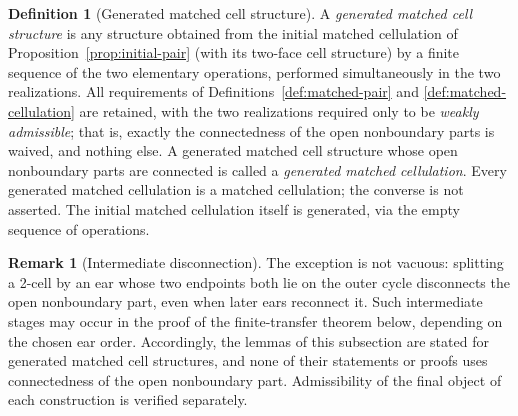 \documentclass[11pt]{article}
\theoremstyle{mainplain}
\theoremstyle{mainroman}
\theoremstyle{definition}
\newtheorem{definition}[theorem]{Definition}
\newtheorem{remark}[theorem]{Remark}
\numberwithin{equation}{section}
\begin{document}
\begin{definition}[Generated matched cell structure]\label{def:generated-structure}
A \emph{generated matched cell structure} is any structure obtained
from the initial matched cellulation of
Proposition~\ref{prop:initial-pair} (with its two-face cell structure)
by a finite sequence of the two elementary operations, performed
simultaneously in the two realizations. All requirements of
Definitions~\ref{def:matched-pair} and \ref{def:matched-cellulation}
are retained, with the two realizations required only to be
\emph{weakly admissible}; that is, exactly the connectedness of the
open nonboundary parts is waived, and nothing else. A generated matched cell
structure whose open nonboundary parts are connected is called a
\emph{generated matched cellulation}. Every generated matched
cellulation is a matched cellulation; the converse is not asserted.
The initial matched cellulation itself is generated, via the empty
sequence of operations.
\end{definition}

\begin{remark}[Intermediate disconnection]\label{rem:intermediate-disconnection}
The exception is not vacuous: splitting a 2-cell by an ear whose two
endpoints both lie on the outer cycle disconnects the open nonboundary
part, even when later ears reconnect it. Such intermediate stages
may occur in the proof of the finite-transfer theorem below, depending
on the chosen ear order. Accordingly,
the lemmas of this subsection are stated for generated matched cell
structures, and none of their statements or proofs uses connectedness
of the open nonboundary part. Admissibility of the final object of
each construction is verified separately.
\end{remark}
\end{document}
